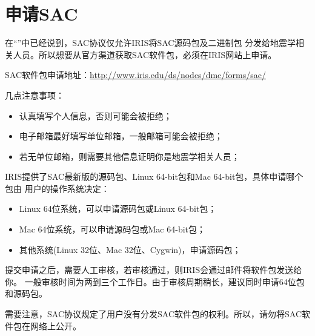 \section{申请SAC}
在``''中已经说到，SAC协议仅允许IRIS将SAC源码包及二进制包
分发给地震学相关人员。所以想要从官方渠道获取SAC软件包，必须在IRIS网站上申请。

SAC软件包申请地址：\url{http://www.iris.edu/ds/nodes/dmc/forms/sac/}

几点注意事项：
\begin{itemize}
\item 认真填写个人信息，否则可能会被拒绝；
\item 电子邮箱最好填写单位邮箱，一般邮箱可能会被拒绝；
\item 若无单位邮箱，则需要其他信息证明你是地震学相关人员；
\end{itemize}

IRIS提供了SAC最新版的源码包、Linux 64-bit包和Mac 64-bit包，具体申请哪个包由
用户的操作系统决定：
\begin{itemize}
\item Linux 64位系统，可以申请源码包或Linux 64-bit包；
\item Mac 64位系统，可以申请源码包或Mac 64-bit包；
\item 其他系统(Linux 32位、Mac 32位、Cygwin)，申请源码包；
\end{itemize}

提交申请之后，需要人工审核，若审核通过，则IRIS会通过邮件将软件包发送给你。
一般审核时间为两到三个工作日。由于审核周期稍长，建议同时申请64位包和源码包。

需要注意，SAC协议规定了用户没有分发SAC软件包的权利。所以，请勿将SAC软件包在网络上公开。

